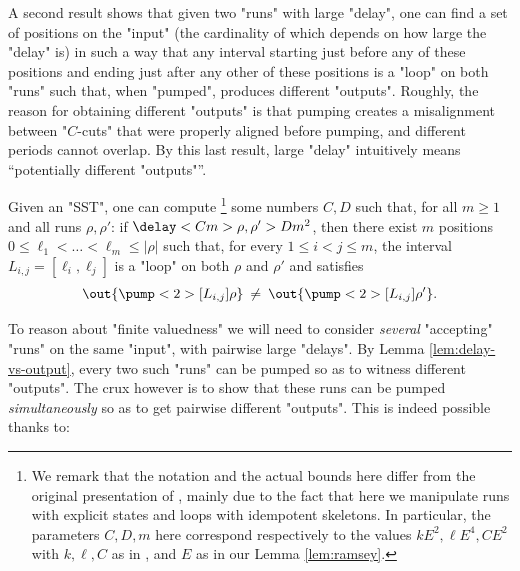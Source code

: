 \documentclass{theoretics}
\begin{document}
A second result shows that given two "runs" with large
"delay", one can find a set of positions on the "input" 
(the cardinality of which depends on how large the "delay" is)
in such a way that any interval starting just before any of 
these positions and ending just after any other of these positions 
is a "loop" on both "runs" such that, when "pumped", produces 
different "outputs". 
Roughly, the reason for obtaining different "outputs" is that pumping creates a misalignment between "$C$-cuts" that were properly aligned before pumping, and different periods cannot overlap.
By this last result, large "delay" intuitively means 
``potentially different "outputs"''.


\begin{lemma}[name={\cite[Lemma 6]{SSTdelay}}]\label{lem:delay-vs-output}%
Given an "SST", one can compute%
\footnote{%
We remark that the notation and the actual bounds here 
differ from the original presentation of \cite{SSTdelay},
mainly due to the fact that here we manipulate runs
with explicit states and loops with idempotent skeletons.
In particular, the parameters $C,D,m$ here correspond respectively to 
the values $k E^2, \ell E^4, C E^2$ with $k,\ell,C$ as in \cite[Lemma 6]{SSTdelay}, and
 $E$ as in our Lemma \ref{lem:ramsey}.
}
some numbers $C,D$ such that, 
for all $m\ge 1$ and all runs $\rho,\rho'$:
if $\delay<C m>{\rho,\rho'} > D m^2$,
then there exist
$m$ positions $0\le \ell_1 < \dots < \ell_m \le |\rho|$ such that,
for every $1 \le i < j \le m$, the interval $L_{i,j}=[\ell_i,\ell_j]$
is a "loop" on both $\rho$ and $\rho'$ and satisfies
\[
  \out{\pump<2>[L_{i,j}]{\rho}} 
  \:\neq\: 
  \out{\pump<2>[L_{i,j}]{\rho'}} .
\]
\end{lemma}

To reason about "finite valuedness" we will need to consider 
\emph{several} "accepting" "runs" on the same "input", with pairwise 
large "delays".
By Lemma \ref{lem:delay-vs-output}, 
every two such "runs" can be pumped so as to witness different "outputs". 
The crux however is to show that these runs can be pumped \emph{simultaneously} 
so as to get pairwise different "outputs".
This is indeed possible thanks to: 
\end{document}
